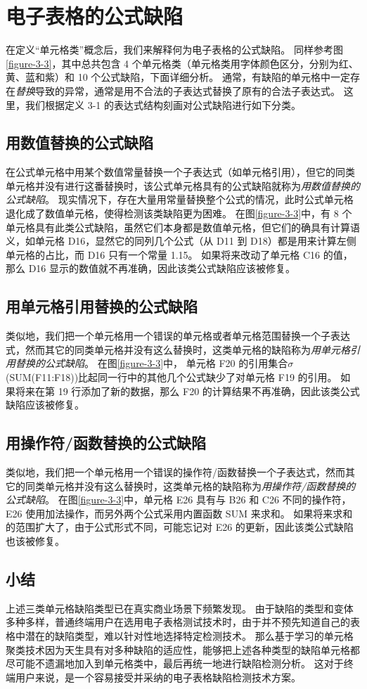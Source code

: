 \section{电子表格的公式缺陷}
在定义“单元格类”概念后，我们来解释何为电子表格的公式缺陷。
同样参考图\ref{figure-3-3}，其中总共包含 4 个单元格类（单元格类用字体颜色区分，分别为红、黄、蓝和紫）和 10 个公式缺陷，下面详细分析。
通常，有缺陷的单元格中一定存在\textit{替换}导致的异常，通常是用不合法的子表达式替换了原有的合法子表达式。
这里，我们根据定义 3-1 的表达式结构刻画对公式缺陷进行如下分类。

\subsection{用数值替换的公式缺陷}
在公式单元格中用某个数值常量替换一个子表达式（如单元格引用），但它的同类单元格并没有进行这番替换时，该公式单元格具有的公式缺陷就称为\textit{用数值替换的公式缺陷}。
现实情况下，存在大量用常量替换整个公式的情况，此时公式单元格退化成了数值单元格，使得检测该类缺陷更为困难。
在图\ref{figure-3-3}中，有 8 个单元格具有此类公式缺陷，虽然它们本身都是数值单元格，但它们的确具有计算语义，如单元格 D16，显然它的同列几个公式（从 D11 到 D18）都是用来计算左侧单元格的占比，而 D16 只有一个常量 1.15。
如果将来改动了单元格 C16 的值，那么 D16 显示的数值就不再准确，因此该类公式缺陷应该被修复。

\subsection{用单元格引用替换的公式缺陷}
类似地，我们把一个单元格用一个错误的单元格或者单元格范围替换一个子表达式，然而其它的同类单元格并没有这么替换时，这类单元格的缺陷称为\textit{用单元格引用替换的公式缺陷}。
在图\ref{figure-3-3}中， 单元格 F20 的引用集合$\sigma$(SUM(F11:F18))比起同一行中的其他几个公式缺少了对单元格 F19 的引用。
如果将来在第 19 行添加了新的数据，那么 F20 的计算结果不再准确，因此该类公式缺陷应该被修复。

\subsection{用操作符/函数替换的公式缺陷}
类似地，我们把一个单元格用一个错误的操作符/函数替换一个子表达式，然而其它的同类单元格并没有这么替换时，这类单元格的缺陷称为\textit{用操作符/函数替换的公式缺陷}。
在图\ref{figure-3-3}中，单元格 E26 具有与 B26 和 C26 不同的操作符，E26 使用加法操作，而另外两个公式采用内置函数 SUM 来求和。
如果将来求和的范围扩大了，由于公式形式不同，可能忘记对 E26 的更新，因此该类公式缺陷也该被修复。

\subsection{小结}
上述三类单元格缺陷类型已在真实商业场景下频繁发现\cite{panko2006facing,powell2008critical}。
由于缺陷的类型和变体多种多样，普通终端用户在选用电子表格测试技术时，由于并不预先知道自己的表格中潜在的缺陷类型，难以针对性地选择特定检测技术。
那么基于学习的单元格聚类技术因为天生具有对多种缺陷的适应性，能够把上述各种类型的缺陷单元格都尽可能不遗漏地加入到单元格类中，最后再统一地进行缺陷检测分析。
这对于终端用户来说，是一个容易接受并采纳的电子表格缺陷检测技术方案。